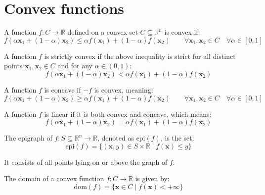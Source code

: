 \section{Convex functions}

\begin{definition}
    A function $f : C \rightarrow\mathbb{R}$ defined on a convex set $C \subseteq \mathbb{R}^n$ is convex if:
    \[f (\alpha \mathbf{x}_1 + (1-\alpha )\mathbf{x}_2) \leq \alpha f (\mathbf{x}_1) + (1-\alpha )f (\mathbf{x}_2) \qquad\forall \mathbf{x}_1,\mathbf{x}_2 \in C\quad\forall\alpha \in[0,1]\]
\end{definition}
\begin{definition}
    A function $f$ is strictly convex if the above inequality is strict for all distinct points $\mathbf{x}_1,\mathbf{x}_2 \in C$ and for any $\alpha\in(0,1)$:
    \[f (\alpha \mathbf{x}_1 + (1-\alpha )\mathbf{x}_2) < \alpha f (\mathbf{x}_1) + (1-\alpha )f (\mathbf{x}_2)\]
\end{definition}
\begin{definition}
    A function $f$ is concave if $-f$ is convex, meaning:
    \[f (\alpha \mathbf{x}_1 + (1-\alpha )\mathbf{x}_2) \geq \alpha f (\mathbf{x}_1) + (1-\alpha )f (\mathbf{x}_2) \qquad\forall \mathbf{x}_1,\mathbf{x}_2 \in C\quad\forall\alpha \in[0,1]\]
\end{definition}
\begin{definition}
    A function $f$ is linear if it is both convex and concave, which means:
        \[f (\alpha \mathbf{x}_1 + (1-\alpha )\mathbf{x}_2) = \alpha f (\mathbf{x}_1) + (1-\alpha )f (\mathbf{x}_2)\]
\end{definition}
\begin{definition}
    The epigraph of $f : S \subseteq \mathbb{R}^n \rightarrow \mathbb{R}$, denoted as $\text{epi}(f)$, is the set:
    \[\text{epi}(f) = \{(\mathbf{x},y) \in S \times \mathbb{R} \mid f(\mathbf{x}) \leq y\}\]
\end{definition}
\noindent It consists of all points lying on or above the graph of $f$.
\begin{definition}
    The domain of a convex function $f : C \rightarrow\mathbb{R}$ is given by:
    \[\text{dom}(f) = \{\mathbf{x} \in C \mid f (\mathbf{x}) <+\infty\}\]
\end{definition}

